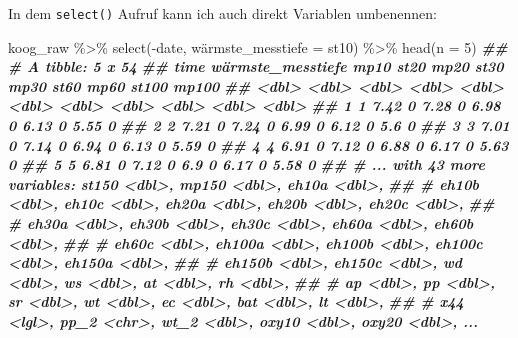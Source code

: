 \documentclass[
]{article}
\newenvironment{Shaded}{\begin{snugshade}}{\end{snugshade}}
\newcommand{\AttributeTok}[1]{\textcolor[rgb]{0.77,0.63,0.00}{#1}}
\newcommand{\DecValTok}[1]{\textcolor[rgb]{0.00,0.00,0.81}{#1}}
\newcommand{\DocumentationTok}[1]{\textcolor[rgb]{0.56,0.35,0.01}{\textbf{\textit{#1}}}}
\newcommand{\FunctionTok}[1]{\textcolor[rgb]{0.00,0.00,0.00}{#1}}
\newcommand{\NormalTok}[1]{#1}
\newcommand{\SpecialCharTok}[1]{\textcolor[rgb]{0.00,0.00,0.00}{#1}}
\begin{document}
In dem \texttt{select()} Aufruf kann ich auch direkt Variablen umbenennen:

\begin{Shaded}
\begin{Highlighting}[]
\NormalTok{koog\_raw }\SpecialCharTok{\%\textgreater{}\%}
  \FunctionTok{select}\NormalTok{(}\SpecialCharTok{{-}}\NormalTok{date, wärmste}\AttributeTok{\_messtiefe =}\NormalTok{ st10) }\SpecialCharTok{\%\textgreater{}\%}
  \FunctionTok{head}\NormalTok{(}\AttributeTok{n =} \DecValTok{5}\NormalTok{)}
\DocumentationTok{\#\# \# A tibble: 5 x 54}
\DocumentationTok{\#\#    time wärmste\_messtiefe  mp10  st20  mp20  st30  mp30  st60  mp60 st100 mp100}
\DocumentationTok{\#\#   \textless{}dbl\textgreater{}             \textless{}dbl\textgreater{} \textless{}dbl\textgreater{} \textless{}dbl\textgreater{} \textless{}dbl\textgreater{} \textless{}dbl\textgreater{} \textless{}dbl\textgreater{} \textless{}dbl\textgreater{} \textless{}dbl\textgreater{} \textless{}dbl\textgreater{} \textless{}dbl\textgreater{}}
\DocumentationTok{\#\# 1     1              7.42     0  7.28     0  6.98     0  6.13     0  5.55     0}
\DocumentationTok{\#\# 2     2              7.21     0  7.24     0  6.99     0  6.12     0  5.6      0}
\DocumentationTok{\#\# 3     3              7.01     0  7.14     0  6.94     0  6.13     0  5.59     0}
\DocumentationTok{\#\# 4     4              6.91     0  7.12     0  6.88     0  6.17     0  5.63     0}
\DocumentationTok{\#\# 5     5              6.81     0  7.12     0  6.9      0  6.17     0  5.58     0}
\DocumentationTok{\#\# \# ... with 43 more variables: st150 \textless{}dbl\textgreater{}, mp150 \textless{}dbl\textgreater{}, eh10a \textless{}dbl\textgreater{},}
\DocumentationTok{\#\# \#   eh10b \textless{}dbl\textgreater{}, eh10c \textless{}dbl\textgreater{}, eh20a \textless{}dbl\textgreater{}, eh20b \textless{}dbl\textgreater{}, eh20c \textless{}dbl\textgreater{},}
\DocumentationTok{\#\# \#   eh30a \textless{}dbl\textgreater{}, eh30b \textless{}dbl\textgreater{}, eh30c \textless{}dbl\textgreater{}, eh60a \textless{}dbl\textgreater{}, eh60b \textless{}dbl\textgreater{},}
\DocumentationTok{\#\# \#   eh60c \textless{}dbl\textgreater{}, eh100a \textless{}dbl\textgreater{}, eh100b \textless{}dbl\textgreater{}, eh100c \textless{}dbl\textgreater{}, eh150a \textless{}dbl\textgreater{},}
\DocumentationTok{\#\# \#   eh150b \textless{}dbl\textgreater{}, eh150c \textless{}dbl\textgreater{}, wd \textless{}dbl\textgreater{}, ws \textless{}dbl\textgreater{}, at \textless{}dbl\textgreater{}, rh \textless{}dbl\textgreater{},}
\DocumentationTok{\#\# \#   ap \textless{}dbl\textgreater{}, pp \textless{}dbl\textgreater{}, sr \textless{}dbl\textgreater{}, wt \textless{}dbl\textgreater{}, ec \textless{}dbl\textgreater{}, bat \textless{}dbl\textgreater{}, lt \textless{}dbl\textgreater{},}
\DocumentationTok{\#\# \#   x44 \textless{}lgl\textgreater{}, pp\_2 \textless{}chr\textgreater{}, wt\_2 \textless{}dbl\textgreater{}, oxy10 \textless{}dbl\textgreater{}, oxy20 \textless{}dbl\textgreater{}, ...}
\end{Highlighting}
\end{Shaded}
\end{document}
